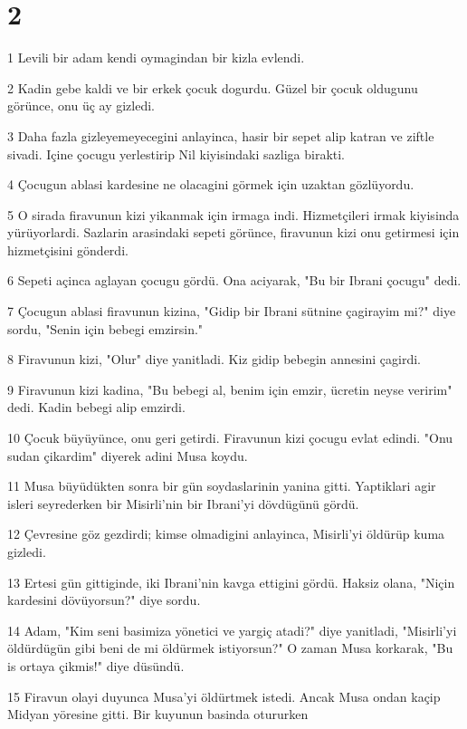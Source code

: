 \chapter{2}

\par 1 Levili bir adam kendi oymagindan bir kizla evlendi.
\par 2 Kadin gebe kaldi ve bir erkek çocuk dogurdu. Güzel bir çocuk oldugunu görünce, onu üç ay gizledi.
\par 3 Daha fazla gizleyemeyecegini anlayinca, hasir bir sepet alip katran ve ziftle sivadi. Içine çocugu yerlestirip Nil kiyisindaki sazliga birakti.
\par 4 Çocugun ablasi kardesine ne olacagini görmek için uzaktan gözlüyordu.
\par 5 O sirada firavunun kizi yikanmak için irmaga indi. Hizmetçileri irmak kiyisinda yürüyorlardi. Sazlarin arasindaki sepeti görünce, firavunun kizi onu getirmesi için hizmetçisini gönderdi.
\par 6 Sepeti açinca aglayan çocugu gördü. Ona aciyarak, "Bu bir Ibrani çocugu" dedi.
\par 7 Çocugun ablasi firavunun kizina, "Gidip bir Ibrani sütnine çagirayim mi?" diye sordu, "Senin için bebegi emzirsin."
\par 8 Firavunun kizi, "Olur" diye yanitladi. Kiz gidip bebegin annesini çagirdi.
\par 9 Firavunun kizi kadina, "Bu bebegi al, benim için emzir, ücretin neyse veririm" dedi. Kadin bebegi alip emzirdi.
\par 10 Çocuk büyüyünce, onu geri getirdi. Firavunun kizi çocugu evlat edindi. "Onu sudan çikardim" diyerek adini Musa koydu.
\par 11 Musa büyüdükten sonra bir gün soydaslarinin yanina gitti. Yaptiklari agir isleri seyrederken bir Misirli'nin bir Ibrani'yi dövdügünü gördü.
\par 12 Çevresine göz gezdirdi; kimse olmadigini anlayinca, Misirli'yi öldürüp kuma gizledi.
\par 13 Ertesi gün gittiginde, iki Ibrani'nin kavga ettigini gördü. Haksiz olana, "Niçin kardesini dövüyorsun?" diye sordu.
\par 14 Adam, "Kim seni basimiza yönetici ve yargiç atadi?" diye yanitladi, "Misirli'yi öldürdügün gibi beni de mi öldürmek istiyorsun?" O zaman Musa korkarak, "Bu is ortaya çikmis!" diye düsündü.
\par 15 Firavun olayi duyunca Musa'yi öldürtmek istedi. Ancak Musa ondan kaçip Midyan yöresine gitti. Bir kuyunun basinda otururken
